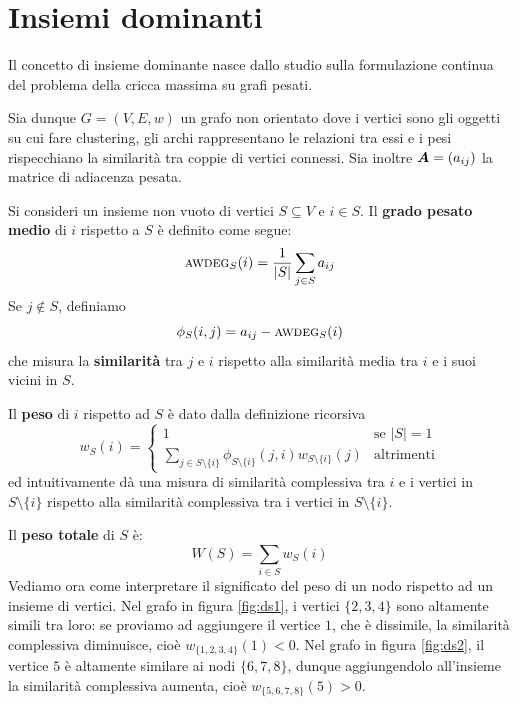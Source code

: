 \section{Insiemi dominanti}

Il concetto di insieme dominante nasce dallo studio sulla formulazione continua del problema della cricca massima su grafi pesati.

Sia dunque $G = (V, E, w)$ un grafo non orientato dove i vertici sono gli oggetti su cui fare clustering, gli archi rappresentano le relazioni tra essi e i pesi rispecchiano la similarità tra coppie di vertici connessi. Sia inoltre $\mat{A} = (a_{ij})$ la matrice di adiacenza pesata.

Si consideri un insieme non vuoto di vertici $S \subseteq V$ e $i \in S$. Il \textbf{grado pesato medio} di $i$ rispetto a $S$ è definito come segue:
\begin{displaymath}
	\textsc{awdeg}_S(i) = \frac{1}{|S|}\sum_{j \in S} a_{ij}
\end{displaymath}
Se $j \notin S$, definiamo
\begin{displaymath}
	\phi_S(i,j) = a_{ij} - \textsc{awdeg}_S(i)
\end{displaymath}
che misura la \textbf{similarità} tra $j$ e $i$ rispetto alla similarità media tra  $i$ e i suoi vicini in $S$.

Il \textbf{peso} di $i$ rispetto ad $S$ è dato dalla definizione ricorsiva
\begin{displaymath}
	w_S(i) = \begin{cases}
		1 & \text{se } |S| = 1 \\
		\displaystyle\sum_{j \in S \setminus \{i\}} \phi_{S \setminus \{i\}} (j, i) w_{S \setminus \{i\}}(j) & \text{altrimenti}
	\end{cases}
\end{displaymath}
ed intuitivamente dà una misura di similarità complessiva tra $i$ e i vertici in $S \setminus \{i\}$ rispetto alla similarità complessiva tra i vertici in $S \setminus \{i\}$.

\noindent Il \textbf{peso totale} di $S$ è:
\begin{displaymath}
	W(S) = \sum_{i \in S} w_S(i)
\end{displaymath}
Vediamo ora come interpretare il significato del peso di un nodo rispetto ad un insieme di vertici. Nel grafo in figura \ref{fig:ds1}, i vertici $\{2,3,4\}$ sono altamente simili tra loro: se proviamo ad aggiungere il vertice $1$, che è dissimile, la similarità complessiva diminuisce, cioè $w_{\{1,2,3,4\}}(1) < 0$. Nel grafo in figura \ref{fig:ds2}, il vertice $5$ è altamente similare ai nodi $\{6,7,8\}$, dunque aggiungendolo all'insieme la similarità complessiva aumenta, cioè $w_{\{5,6,7,8\}}(5) > 0$.

